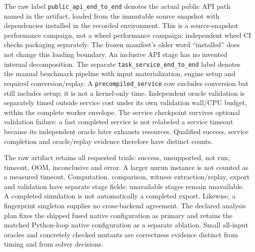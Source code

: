 \documentclass[10pt,a4paper]{article}
\begin{document}
The raw label \texttt{public\_api\_end\_to\_end} denotes the actual public API path named
in the artifact, loaded from the immutable source snapshot with dependencies installed in
the recorded environment. This is a source-snapshot performance campaign, not a wheel
performance campaign; independent wheel CI checks packaging separately. The frozen
manifest's older word ``installed'' does not change this loading boundary.
An inclusive API stage has no invented internal decomposition. The separate
\texttt{task\_service\_end\_to\_end} label denotes the manual benchmark pipeline with
input materialization, engine setup and required conversion/replay. A
\texttt{precompiled\_service} row excludes conversion but still includes setup; it is not
a kernel-only time. Independent oracle validation is separately timed outside service cost
under its own validation wall/CPU budget, within the complete worker envelope. The service
checkpoint survives optional validation failure: a fast completed service is not relabeled
a service timeout because its independent oracle later exhausts resources. Qualified
success, service completion and oracle/replay evidence therefore have distinct counts.

The raw artifact retains all requested trials: success, unsupported, not run, timeout, OOM,
inconclusive and error. A larger unrun instance is not counted as a measured timeout.
Computation, comparison, witness extraction/replay, export and validation have separate stage
fields; unavailable stages remain unavailable. A completed simulation is not automatically
a completed export. Likewise, a fingerprint singleton supplies no cross-backend agreement.
The declared analysis plan fixes the shipped fused native configuration as primary and
retains the matched Python-loop native configuration as a separate ablation.
Small all-input oracles and concretely checked mutants are correctness evidence distinct
from timing and from solver decisions.
\end{document}
